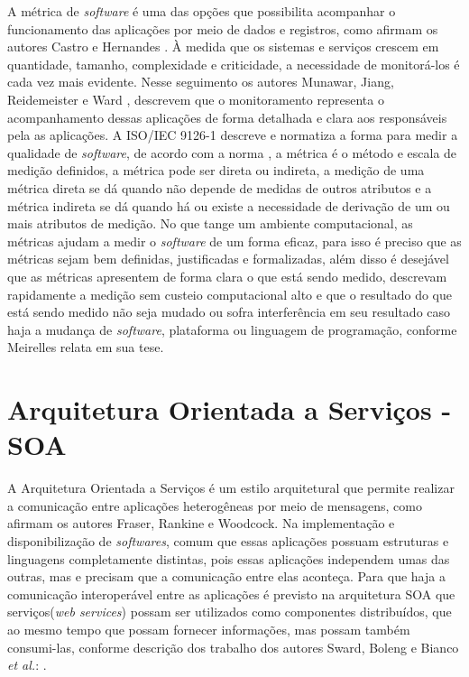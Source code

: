 A métrica de \textit{software} é uma das opções que possibilita acompanhar o funcionamento das aplicações por meio de dados e registros, como afirmam os autores Castro e Hernandes \cite{de2016metrica}. À medida que os sistemas e serviços crescem em quantidade, tamanho, complexidade e criticidade, a necessidade de monitorá-los é cada vez mais evidente. Nesse seguimento os autores Munawar, Jiang, Reidemeister e Ward  \cite{5298441}, descrevem que o monitoramento representa o acompanhamento dessas aplicações de forma detalhada e clara aos responsáveis pela as aplicações. A ISO/IEC 9126-1 \cite{associaccao2003nbr} descreve e normatiza a forma para medir a qualidade de \textit{software}, de acordo com a norma \cite{associaccao2003nbr}, a métrica é o método e escala de medição definidos, a métrica pode ser direta ou indireta, a medição de uma métrica direta se dá quando não depende de medidas de outros atributos e a métrica indireta se dá quando há ou existe a necessidade de derivação de um ou mais atributos de medição.
No que tange um ambiente computacional, as métricas ajudam a medir o \textit{software} de um forma eficaz, para isso é preciso que as métricas sejam bem definidas, justificadas e formalizadas, além disso é desejável que as métricas apresentem de forma clara o que está sendo medido, descrevam rapidamente a medição sem custeio computacional alto e que o resultado do que está sendo medido não seja mudado ou sofra interferência em seu resultado caso haja a mudança de \textit{software}, plataforma ou linguagem de programação, conforme Meirelles \cite{meirelles2013monitoramento} relata em sua tese.


\section{Arquitetura Orientada a Serviços - SOA}

A Arquitetura Orientada a Serviços é um estilo arquitetural que permite realizar a comunicação entre aplicações heterogêneas por meio de mensagens, como afirmam os autores Fraser, Rankine e Woodcock\cite{fraser2007service}. Na implementação e disponibilização de \textit{softwares}, comum que essas aplicações possuam estruturas e linguagens completamente distintas, pois essas aplicações independem umas das outras, mas e precisam que a comunicação entre elas aconteça. Para que haja a comunicação interoperável entre as aplicações é previsto na arquitetura \acrshort{SOA} que serviços(\textit{web services}) possam ser utilizados como componentes distribuídos, que ao mesmo tempo que possam fornecer informações, mas possam também consumi-las, conforme descrição dos trabalho dos autores Sward,  Boleng e Bianco \textit{et al.}: \cite{sward2011service,bianco2011architecting}.

